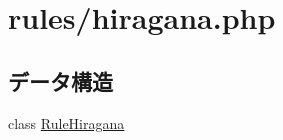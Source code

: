 \hypertarget{hiragana_8php}{
\section{rules/hiragana.php}
\label{hiragana_8php}
}
\subsection*{データ構造}
\begin{DoxyCompactItemize}
\item 
class \hyperlink{class_rule_hiragana}{\-Rule\-Hiragana}
\end{DoxyCompactItemize}
